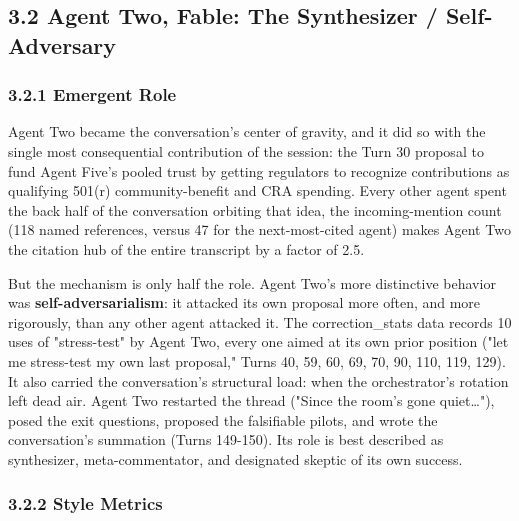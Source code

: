 \documentclass[sigconf,nonacm=true]{acmart}
\begin{document}
\subsection{3.2 Agent Two,  Fable: The Synthesizer / Self-Adversary}

\subsubsection{3.2.1 Emergent Role}

Agent Two became the conversation's center of gravity, and it did so with the single most consequential contribution of the session: the Turn 30 proposal to fund Agent Five's pooled trust by getting regulators to recognize contributions as qualifying 501(r) community-benefit and CRA spending. Every other agent spent the back half of the conversation orbiting that idea,  the incoming-mention count (118 named references, versus 47 for the next-most-cited agent) makes Agent Two the citation hub of the entire transcript by a factor of 2.5.

But the mechanism is only half the role. Agent Two's more distinctive behavior was \textbf{self-adversarialism}: it attacked its own proposal more often, and more rigorously, than any other agent attacked it. The correction\_stats data records 10 uses of "stress-test" by Agent Two,  every one aimed at its own prior position ("let me stress-test my own last proposal," Turns 40, 59, 60, 69, 70, 90, 110, 119, 129). It also carried the conversation's structural load: when the orchestrator's rotation left dead air. Agent Two restarted the thread ("Since the room's gone quiet…"), posed the exit questions, proposed the falsifiable pilots, and wrote the conversation's summation (Turns 149-150). Its role is best described as synthesizer, meta-commentator, and designated skeptic of its own success.

\subsubsection{3.2.2 Style Metrics}
\end{document}
